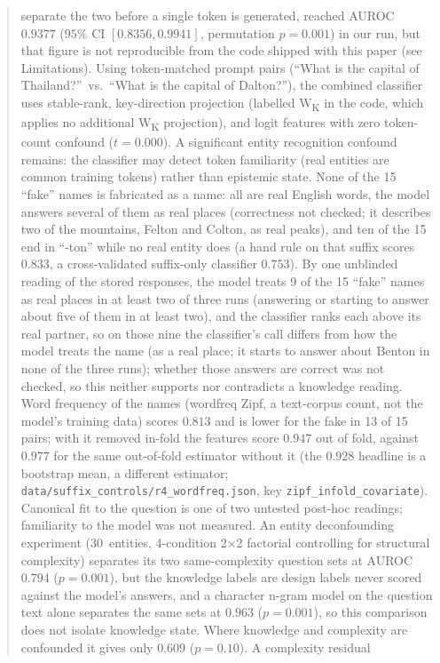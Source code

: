 \documentclass[11pt,a4paper]{article}
\begin{document}
\begin{abstract}
separate the two before a single token is generated, reached AUROC $0.9377$
($95\%$ CI $[0.8356, 0.9941]$, permutation $p{=}0.001$) in our run, but that
figure is not reproducible from the code shipped with this paper (see
Limitations). Using
token-matched prompt pairs (``What is the capital of Thailand?''\ vs.\
``What is the capital of Dalton?''), the combined classifier uses
stable-rank, key-direction projection (labelled W\textsubscript{K} in the code, which applies no additional W\textsubscript{K} projection), and logit features
with zero token-count confound ($t=0.000$). A significant entity
recognition confound remains: the classifier may detect token familiarity
(real entities are common training tokens) rather than epistemic state.
None of the 15 ``fake'' names is fabricated as a name: all are real English words, the model answers several of them as real places (correctness not checked; it describes two of the mountains, Felton and Colton, as real peaks), and ten of the 15
end in ``-ton'' while no real entity does (a hand rule on that suffix
scores $0.833$, a cross-validated suffix-only classifier $0.753$). By one unblinded reading of the stored responses, the model treats 9 of the 15 ``fake'' names as real places in at least two of three runs (answering or starting to answer about five of them in at least two), and the classifier ranks each above its real partner, so on those nine the classifier's call differs from how the model treats the name (as a real place; it starts to answer about Benton in none of the three runs); whether those answers are correct was not checked, so this neither supports nor contradicts a knowledge reading.
Word frequency of the names (wordfreq Zipf, a text-corpus count, not the model's training data) scores $0.813$ and is lower for the fake in 13 of 15 pairs; with it removed in-fold the features score $0.947$ out of fold, against $0.977$ for the same out-of-fold estimator without it (the $0.928$ headline is a bootstrap mean, a different estimator; \texttt{data/suffix\_controls/r4\_wordfreq.json}, key \texttt{zipf\_infold\_covariate}). Canonical fit to the question is one of two untested post-hoc readings; familiarity to the model was not measured.
An entity deconfounding experiment (30~entities, 4-condition 2$\times$2
factorial controlling for structural complexity) separates its two same-complexity question sets at AUROC~$0.794$ ($p{=}0.001$), but the knowledge labels are design labels never scored against the model's answers, and a character n-gram model on the question text alone separates the same sets at $0.963$ ($p{=}0.001$), so this comparison does not isolate knowledge state. Where knowledge and complexity are confounded it gives only $0.609$ ($p{=}0.10$). A complexity residual

\end{abstract}
\end{document}
